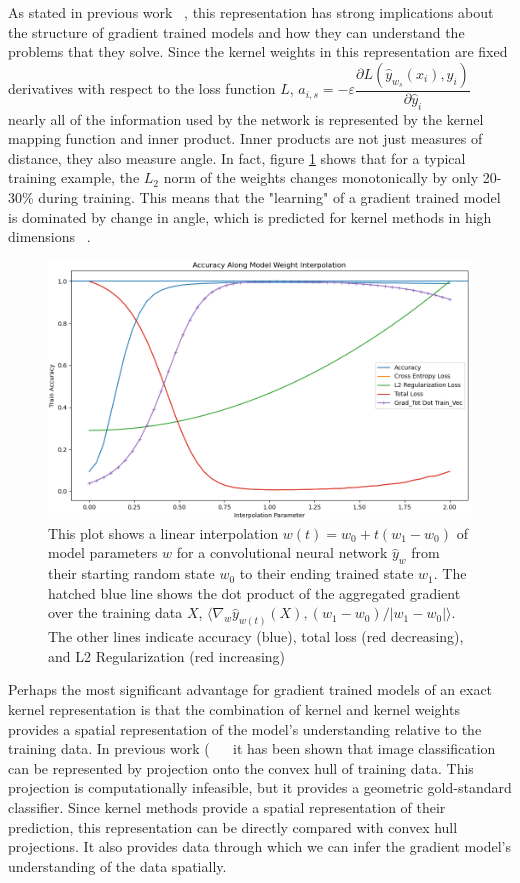 As stated in previous work ~\cite{domingos2020}, this representation has strong implications about the structure of gradient trained models and how they can understand the problems that they solve. Since the kernel weights in this representation are fixed derivatives with respect to the loss function $L$, $a_{i, s} = -\varepsilon  \dfrac{\partial L(\hat y_{w_s}(x_i),  y_i)}{\partial \hat y_i}$ nearly all of the information used by the network is represented by the kernel mapping function and inner product. Inner products are not just measures of distance, they also measure angle. In fact, figure \ref{fig:grad} shows that for a typical training example, the $L_2$ norm of the weights changes monotonically by only 20-30\% during training. This means that the "learning" of a gradient trained model is dominated by change in angle, which is predicted for kernel methods in high dimensions ~\cite{hardle2004nonparametric}.

\begin{figure}[!h]
\centering
\includegraphics[width=12cm]{c3_figures/stab-n-201mnist-C32-100-100-10-0.001-0.0001-eval-mod_int_acc-trn.png}
\caption{This plot shows a linear interpolation $w(t) = w_0 + t(w_{1} - w_0)$ of model parameters $w$ for a convolutional neural network $\hat y_w$ from their starting random state $w_0$ to their ending trained state $w_1$. The hatched blue line shows the dot product of the aggregated gradient over the training data $X$, $\langle \nabla_w \hat y_{w(t)}(X), (w_1 - w_0)/|w_1 - w_0| \rangle$. The other lines indicate accuracy (blue), total loss (red decreasing), and L2 Regularization (red increasing)}  
\label{fig:grad}
\end{figure}

Perhaps the most significant advantage for gradient trained models of an exact kernel representation is that the combination of kernel and kernel weights provides a spatial representation of the model's understanding relative to the training data. In previous work (~\cite{gillette2022data} ~\cite{yousefzadeh2021deep} it has been shown that image classification can be represented by projection onto the convex hull of training data. This projection is computationally infeasible, but it provides a geometric gold-standard classifier. Since kernel methods provide a spatial representation of their prediction, this representation can be directly compared with convex hull projections. It also provides data through which we can infer the gradient model's understanding of the data spatially. 

